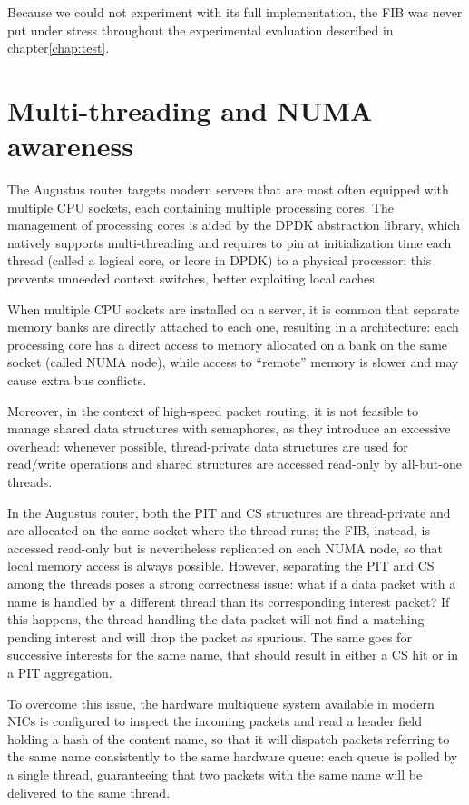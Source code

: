 \documentclass[11pt,a4paper,twoside,titlepage,openany]{book}
\newcommand{\mono}[1]{{\footnotesize \ttfamily #1}}
\begin{document}
Because we could not experiment with its full implementation, the \gls{FIB} was never put under stress throughout the experimental evaluation described in chapter\ref{chap:test}.

\section{Multi-threading and NUMA awareness}\label{sec:augustus.numa}
The Augustus router targets modern servers that are most often equipped with multiple CPU sockets, each containing multiple processing cores. The management of processing cores is aided by the DPDK abstraction library, which natively supports multi-threading and requires to pin at initialization time each thread (called a logical core, or \mono{lcore} in DPDK) to a physical processor: this prevents unneeded context switches, better exploiting local caches.

When multiple CPU sockets are installed on a server, it is common that separate memory banks are directly attached to each one, resulting in a  architecture: each processing core has a direct access to memory allocated on a bank on the same socket (called NUMA node), while access to ``remote'' memory is slower and may cause extra bus conflicts.

Moreover, in the context of high-speed packet routing, it is not feasible to manage shared data structures with semaphores, as they introduce an excessive overhead: whenever possible, thread-private data structures are used for read/write operations and shared structures are accessed read-only by all-but-one threads.

In the Augustus router, both the \gls{PIT} and \gls{CS} structures are thread-private and are allocated on the same socket where the thread runs; the \gls{FIB}, instead, is accessed read-only but is nevertheless replicated on each NUMA node, so that local memory access is always possible.
However, separating the \gls{PIT} and \gls{CS} among the threads poses a strong correctness issue: what if a data packet with a name is handled by a different thread than its corresponding interest packet? If this happens, the thread handling the data packet will not find a matching pending interest and will drop the packet as spurious. The same goes for successive interests for the same name, that should result in either a CS hit or in a PIT aggregation.

To overcome this issue, the hardware multiqueue system available in modern NICs is configured to inspect the incoming packets and read a header field holding a hash of the content name, so that it will dispatch packets referring to the same name consistently to the same hardware queue: each queue is polled by a single thread, guaranteeing that two packets with the same name will be delivered to the same thread.
\end{document}
